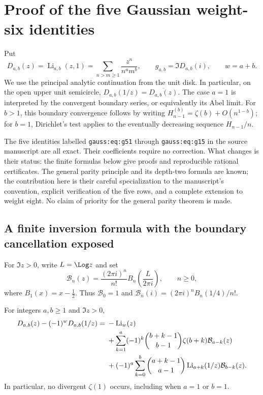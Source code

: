 
\section{Proof of the five Gaussian weight-six identities}
\label{sec:gaussian-six-proof}

Put
\[
 D_{a,b}(z)=\operatorname{Li}_{a,b}(z,1)
   =\sum_{n>m\ge1}\frac{z^n}{n^a m^b},\qquad
 g_{a,b}=\Im D_{a,b}(i),\qquad w=a+b.
\]
We use the principal analytic continuation from the unit disk. In particular,
on the open upper unit semicircle, $D_{a,b}(1/z)=\overline{D_{a,b}(z)}$.
The case $a=1$ is interpreted by the convergent boundary series, or
equivalently its Abel limit. For $b>1$, this boundary convergence follows
by writing $H_{n-1}^{(b)}=\zeta(b)+O(n^{1-b})$; for $b=1$, Dirichlet's
test applies to the eventually decreasing sequence $H_{n-1}/n$.

The five identities labelled \texttt{gauss:eq:g51} through
\texttt{gauss:eq:g15} in the source manuscript are all exact. Their
coefficients require no correction. What changes is their status: the
finite formulas below give proofs and reproducible rational certificates.
The general parity principle and its depth-two formula are known; the
contribution here is their careful specialization to the manuscript's
convention, explicit verification of the five rows, and a complete extension
to weight eight. No claim of priority for the general parity theorem is made.

\subsection{A finite inversion formula with the boundary cancellation exposed}

For $\Im z>0$, write $L=\Log z$ and set
\[
 \mathcal B_n(z)=\frac{(2\pi i)^n}{n!}
 B_n\!\left(\frac{L}{2\pi i}\right),\qquad n\ge0,
\]
where $B_1(x)=x-\tfrac12$. Thus $\mathcal B_0=1$ and
$\mathcal B_n(i)=(2\pi i)^nB_n(1/4)/n!$.

\begin{theorem}
\label{thm:gaussian-inversion}
For integers $a,b\ge1$ and $\Im z>0$,
\begin{align}
 D_{a,b}(z)-(-1)^wD_{a,b}(1/z)
 ={}&-\operatorname{Li}_w(z)\label{eq:gaussian-inversion}\\
 &+\sum_{k=1}^{a}(-1)^k
   \binom{b+k-1}{b-1}\zeta(b+k)\mathcal B_{a-k}(z)\notag\\
 &+(-1)^a\sum_{k=0}^{b}\binom{a+k-1}{a-1}
   \operatorname{Li}_{a+k}(1/z)\mathcal B_{b-k}(z).\notag
\end{align}
In particular, no divergent $\zeta(1)$ occurs, including when $a=1$ or
$b=1$.
\end{theorem}

